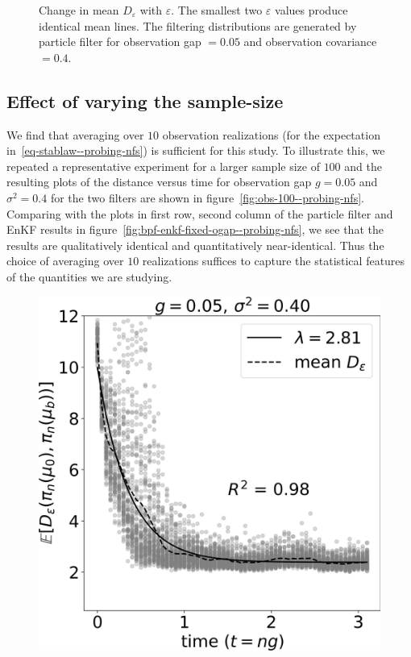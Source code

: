 {\begin{figure}
    \caption{Change in mean $D_\varepsilon$ with $\varepsilon$. The smallest two  $\varepsilon$ values produce identical mean lines. The filtering distributions are generated by particle filter for observation gap  $=0.05$ and observation covariance $=0.4$.}
    \label{fig:bpf-eps-all--probing-nfs}
\end{figure}
}

{\color{mypink}\subsection{Effect of varying the sample-size}\label{ssec-sample-size--probing-nfs}
We find that averaging over $10$ observation realizations (for the expectation in~\eqref{eq-stablaw--probing-nfs}) is sufficient for this study. To illustrate this, we repeated a representative experiment for a larger sample size  of $100$ and the resulting plots of the distance versus time for observation gap $g=0.05$ and $\sigma^2=0.4$ for the two filters are shown in figure~\ref{fig:obs-100--probing-nfs}. Comparing with the plots in first row, second column of the particle filter and EnKF results in figure~\ref{fig:bpf-enkf-fixed-ogap--probing-nfs}, we see that the results are qualitatively identical and quantitatively near-identical. Thus the choice of averaging over $10$ realizations suffices to capture the statistical features of the quantities we are studying.
\begin{figure}
    \includegraphics[scale=0.1]{probing-nfs/plots/plots-bpf-rate_obs_100.jpg}

\end{figure}}
